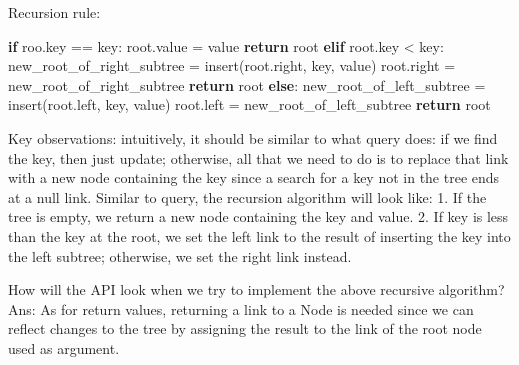 \documentclass[11pt]{article}
\newenvironment{Shaded}{}{}
\newcommand{\NormalTok}[1]{{#1}}
\newcommand{\ControlFlowTok}[1]{\textcolor[rgb]{0.00,0.44,0.13}{\textbf{{#1}}}}
\newcommand{\OperatorTok}[1]{\textcolor[rgb]{0.40,0.40,0.40}{{#1}}}
\begin{document}
Recursion rule:

\begin{Shaded}
\begin{Highlighting}[]
\ControlFlowTok{if}\NormalTok{ roo.key }\OperatorTok{==}\NormalTok{ key:}
\NormalTok{    root.value }\OperatorTok{=}\NormalTok{ value}
    \ControlFlowTok{return}\NormalTok{ root}
\ControlFlowTok{elif}\NormalTok{ root.key }\OperatorTok{<}\NormalTok{ key:}
\NormalTok{    new_root_of_right_subtree }\OperatorTok{=}\NormalTok{ insert(root.right, key, value)}
\NormalTok{    root.right }\OperatorTok{=}\NormalTok{ new_root_of_right_subtree}
    \ControlFlowTok{return}\NormalTok{ root}
\ControlFlowTok{else}\NormalTok{:}
\NormalTok{    new_root_of_left_subtree }\OperatorTok{=}\NormalTok{ insert(root.left, key, value)}
\NormalTok{    root.left }\OperatorTok{=}\NormalTok{ new_root_of_left_subtree}
    \ControlFlowTok{return}\NormalTok{ root}
\end{Highlighting}
\end{Shaded}

Key observations: intuitively, it should be similar to what query does:
if we find the key, then just update; otherwise, all that we need to do
is to replace that link with a new node containing the key since a
search for a key not in the tree ends at a null link. Similar to query,
the recursion algorithm will look like: 1. If the tree is empty, we
return a new node containing the key and value. 2. If key is less than
the key at the root, we set the left link to the result of inserting the
key into the left subtree; otherwise, we set the right link instead.

How will the API look when we try to implement the above recursive
algorithm?\\
Ans: As for return values, returning a link to a Node is needed since we
can reflect changes to the tree by assigning the result to the link of
the root node used as argument.
\end{document}
